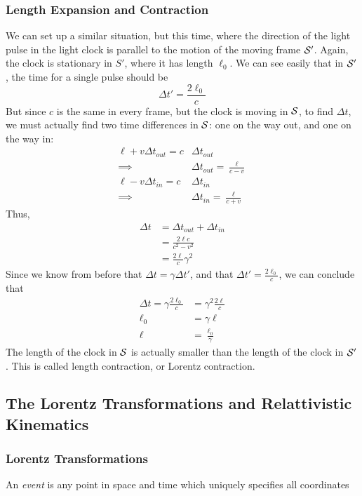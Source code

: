 \documentclass[a4paper]{article}
\begin{document}
\subsubsection{Length Expansion and Contraction}
We can set up a similar situation, but this time, where the direction of the
light pulse in the light clock is parallel to the motion of the moving
frame $\S'$. Again, the clock is stationary in $S'$, where it has length
$\ell_0$. We can see easily that in $\S'$, the time for a single pulse
should be
\[ \Delta t' = \frac{2\ell_0}{c} \]
But since $c$ is the same in every frame, but the clock is moving in $\S$, to
find $\Delta t$, we must actually find two time differences in $\S$: one on
the way out, and one on the way in:
\begin{align*}
	\ell + v\Delta t_{out} = c&\Delta t_{out}\\
	\implies &\Delta t_{out}=\frac{\ell}{c-v}\\
	\ell - v\Delta t_{in} = c&\Delta t_{in}\\
	\implies &\Delta t_{in}=\frac{\ell}{c+v}
\end{align*}
Thus,
\begin{align*}
	\Delta t &= \Delta t_{out}+\Delta t_{in}\\
		 &= \frac{2\ell c}{c^2-v^2}\\
		 &= \frac{2\ell}{c}\gamma^2
\end{align*}
Since we know from before that $\Delta t = \gamma\Delta t'$, and that
$\Delta t' = \frac{2\ell_0}{c}$, we can conclude that
\begin{align*}
	\Delta t = \gamma \frac{2\ell_0}{c} &= \gamma^2\frac{2\ell}{c}\\
	\ell_0 &= \gamma\ell\\
	\ell &= \frac{\ell_0}{\gamma}
\end{align*}
The length of the clock in $\S$ is actually smaller than the length of the
clock in $\S'$. This is called length contraction, or Lorentz contraction.

\subsection{The Lorentz Transformations and Relattivistic Kinematics}
\subsubsection{Lorentz Transformations}
\begin{defi}[Event]
	An \emph{event} is any point in space and time which uniquely specifies
	all coordinates
\end{defi}
\end{document}
